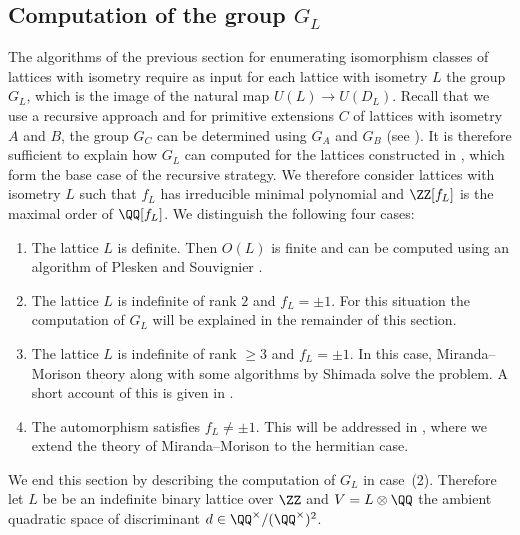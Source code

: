 \subsection{Computation of the group $G_L$}\label{subsec:computeGL}
The algorithms of the previous section for enumerating isomorphism classes of lattices with isometry
require as input for each lattice with isometry $L$ the group $G_L$, which is the image of
the natural map $U(L) \to U(D_L)$. Recall that we use a recursive approach 
and for primitive extensions $C$ of lattices with isometry $A$ and $B$, the group
$G_C$ can be determined using $G_A$ and $G_B$ (see ). It is therefore sufficient to explain how $G_L$ can computed for the lattices constructed in , which form the base case of the recursive strategy.
We therefore consider lattices with isometry $L$ such that $f_L$ has irreducible minimal polynomial and $\ZZ[f_L]$ is the maximal order of $\QQ[f_L]$.
We distinguish the following four cases:

\begin{enumerate}
  \item
    The lattice $L$ is definite. Then $O(L)$ is finite and can be computed using an algorithm of Plesken and Souvignier \cite{Plesken-Souvignier}.
  \item
    The lattice $L$ is indefinite of rank $2$ and $f_L = \pm 1$. For this situation the computation of $G_L$ will be explained in the remainder of this section.
  \item
    The lattice $L$ is indefinite of rank $\geq 3$ and $f_L = \pm 1$. In this case, Miranda--Morison theory \cite{miranda-morrisonI, miranda-morrisonII} along with some algorithms by Shimada \cite{shimada2018} solve the problem.
    A short account of this is given in .
  \item
    The automorphism satisfies $f_L \neq \pm 1$. This will be addressed in ,
    where we extend the theory of Miranda--Morison to the hermitian case.
\end{enumerate}


We end this section by describing the computation of $G_L$ in case~(2).
Therefore let $L$ be be an indefinite binary lattice over $\ZZ$ and $V = L \otimes \QQ$ the ambient quadratic space of discriminant $d \in \QQ^\times/(\QQ^\times)^2$.

